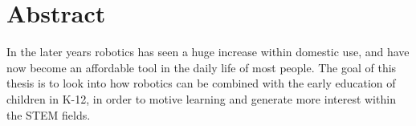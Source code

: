 \section*{Abstract}
	In the later years robotics has seen a huge increase within domestic use, and have now become an affordable tool in the daily life of most people.
	The goal of this thesis is to look into how robotics can be combined with the early education of children in K-12, 
	in order to motive learning and generate more interest within the STEM fields. 
	
	
